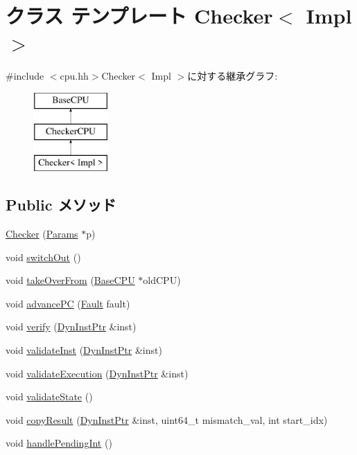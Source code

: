 \hypertarget{classChecker}{
\section{クラス テンプレート Checker$<$ Impl $>$}
\label{classChecker}
}


{\ttfamily \#include $<$cpu.hh$>$}Checker$<$ Impl $>$に対する継承グラフ:\begin{figure}[H]
\begin{center}
\leavevmode
\includegraphics[height=3cm]{classChecker}
\end{center}
\end{figure}
\subsection*{Public メソッド}
\begin{DoxyCompactItemize}
\item 
\hyperlink{classChecker_a5e269456f6adf2d73f7c41acd1b626e9}{Checker} (\hyperlink{classCheckerCPU_a56bf98a1e02b979e88cbf64420995961}{Params} $\ast$p)
\item 
void \hyperlink{classChecker_a05f299b443f8cc73a93d61572edc0218}{switchOut} ()
\item 
void \hyperlink{classChecker_ac82d2b8d331b2e8e6854a95d2917dfa2}{takeOverFrom} (\hyperlink{classBaseCPU_1_1BaseCPU}{BaseCPU} $\ast$oldCPU)
\item 
void \hyperlink{classChecker_a9ff8fd374877c2ff6c10178aaad00852}{advancePC} (\hyperlink{classRefCountingPtr}{Fault} fault)
\item 
void \hyperlink{classChecker_af7588193b0187186501d440f02645196}{verify} (\hyperlink{classChecker_a028ce10889c5f6450239d9e9a7347976}{DynInstPtr} \&inst)
\item 
void \hyperlink{classChecker_afacc503db5e7b6c0dd9925071a6f2732}{validateInst} (\hyperlink{classChecker_a028ce10889c5f6450239d9e9a7347976}{DynInstPtr} \&inst)
\item 
void \hyperlink{classChecker_ae48ab62afce87955bf9c238afb16e035}{validateExecution} (\hyperlink{classChecker_a028ce10889c5f6450239d9e9a7347976}{DynInstPtr} \&inst)
\item 
void \hyperlink{classChecker_ab6bf9488b2aaa90f5c6ca2491c852d30}{validateState} ()
\item 
void \hyperlink{classChecker_afa9c0925515db4634c3902c386239f3c}{copyResult} (\hyperlink{classChecker_a028ce10889c5f6450239d9e9a7347976}{DynInstPtr} \&inst, uint64\_\-t mismatch\_\-val, int start\_\-idx)
\item 
void \hyperlink{classChecker_a7e1306bfefe8be093795acd567266c94}{handlePendingInt} ()
\end{DoxyCompactItemize}
